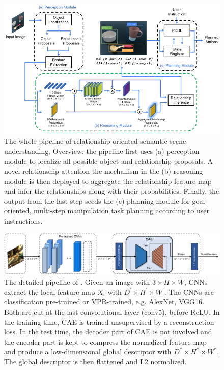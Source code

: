 \begin{figure}[!ht]
    \centering
    \includegraphics[width=0.9\columnwidth]{figure/pqe/pipeline_relationship.png}
    \caption{The whole pipeline of relationship-oriented semantic scene understanding. Overview: the pipeline first uses (a) perception module to localize all possible object and relationship proposals. A novel relationship-attention
    the mechanism in the (b) reasoning module is then deployed to aggregate the relationship feature map and infer the relationships along with their probabilities.
    Finally, the output from the last step seeds the (c) planning module for goal-oriented, multi-step manipulation task planning according to user instructions. }
    \label{fig:pipeline_relationship}
 \end{figure}

 \begin{figure}[!ht]
    \centering
    \includegraphics[width=\columnwidth]{figure/pqe/approach.pdf}
	\caption{The detailed pipeline of \cite{ye2022condition}. Given an image with $3\times{H}\times{W}$, CNNs  extract the local feature map $X_i$ with $D^{'}\times{H^{'}}\times{W^{'}}$. The CNNs are classification pre-trained or VPR-trained, e.g. AlexNet, VGG16. Both are cut at the last convolutional layer (conv5), before ReLU. In the training time, CAE is trained unsupervised by a reconstruction loss. In the test time, the decoder part of CAE is not involved and the encoder part is kept to compress the normalized feature map and produce a low-dimensional global descriptor with $D^{''}\times{H^{''}}\times{W^{''}}$. The global descriptor is then flattened and L2 normalized.}
    \label{fig:approach_VPR}
 \end{figure}



